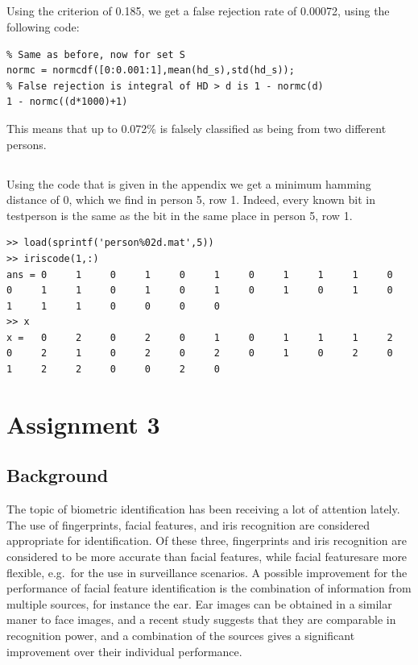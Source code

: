 \documentclass{article}
\begin{document}
\subsection{}
Using the criterion of 0.185, we get a false rejection rate of 0.00072, using the following code:
\begin{lstlisting}
% Same as before, now for set S
normc = normcdf([0:0.001:1],mean(hd_s),std(hd_s));
% False rejection is integral of HD > d is 1 - normc(d)
1 - normc((d*1000)+1)
\end{lstlisting}
This means that up to 0.072\% is falsely classified as being from two different persons.

\subsection{}
Using the code that is given in the appendix we get a minimum hamming distance of $0$, which we find in person 5, row 1. Indeed, every known bit in testperson is the same as the bit in the same place in person 5, row 1.
\begin{lstlisting}
>> load(sprintf('person%02d.mat',5))
>> iriscode(1,:)
ans = 0     1     0     1     0     1     0     1     1     1     0     0     1     1     0     1     0     1     0     1     0     1     0     1     1     1     0     0     0     0
>> x
x =   0     2     0     2     0     1     0     1     1     1     2     0     2     1     0     2     0     2     0     1     0     2     0     1     2     2     0     0     2     0
\end{lstlisting}


\section{Assignment 3}
\subsection{Background}
The topic of biometric identification has been receiving a lot of attention lately. %
The use of fingerprints, facial features, and iris recognition are considered appropriate for identification.
Of these three, fingerprints and iris recognition are considered to be more accurate than facial features,
while facial featuresare more flexible, e.g.\ for the use in surveillance scenarios.
A possible improvement for the performance of facial feature identification is the combination of information from multiple sources,
for instance the ear.
Ear images can be obtained in a similar maner to face images, 
and a recent study suggests that they are comparable in recognition power\cite{chang2003comparison},
and a combination of the sources gives a significant improvement over their individual performance.
\end{document}
